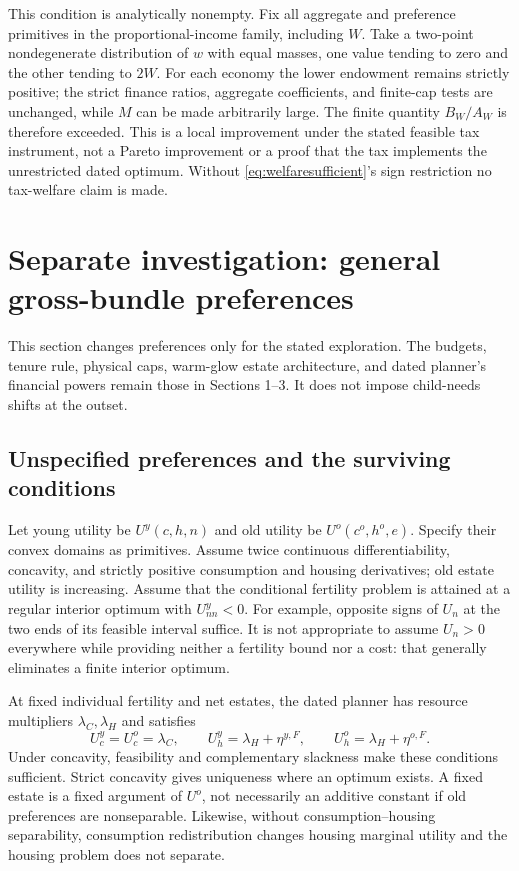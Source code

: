 \documentclass[11pt]{article}
\begin{document}
This condition is analytically nonempty. Fix all aggregate and preference primitives in the proportional-income family, including $W$. Take a two-point nondegenerate distribution of $w$ with equal masses, one value tending to zero and the other tending to $2W$. For each economy the lower endowment remains strictly positive; the strict finance ratios, aggregate coefficients, and finite-cap tests are unchanged, while $M$ can be made arbitrarily large. The finite quantity $B_W/A_W$ is therefore exceeded. This is a local improvement under the stated feasible tax instrument, not a Pareto improvement or a proof that the tax implements the unrestricted dated optimum. Without \eqref{eq:welfaresufficient}'s sign restriction no tax-welfare claim is made.
\clearpage
\section{Separate investigation: general gross-bundle preferences}\label{app:general}
This section changes preferences only for the stated exploration. The budgets, tenure rule, physical caps, warm-glow estate architecture, and dated planner's financial powers remain those in Sections 1--3. It does not impose child-needs shifts at the outset.

\subsection{Unspecified preferences and the surviving conditions}
Let young utility be $U^y(c,h,n)$ and old utility be $U^o(c^o,h^o,e)$. Specify their convex domains as primitives. Assume twice continuous differentiability, concavity, and strictly positive consumption and housing derivatives; old estate utility is increasing. Assume that the conditional fertility problem is attained at a regular interior optimum with $U^y_{nn}<0$. For example, opposite signs of $U_n$ at the two ends of its feasible interval suffice. It is not appropriate to assume $U_n>0$ everywhere while providing neither a fertility bound nor a cost: that generally eliminates a finite interior optimum.

At fixed individual fertility and net estates, the dated planner has resource multipliers $\lambda_C,\lambda_H$ and satisfies
\begin{equation}
 U_c^y=U_c^o=\lambda_C,\qquad
 U_h^y=\lambda_H+\eta^{y,F},\qquad
 U_h^o=\lambda_H+\eta^{o,F}.\label{eq:generalplanner}
\end{equation}
Under concavity, feasibility and complementary slackness make these conditions sufficient. Strict concavity gives uniqueness where an optimum exists. A fixed estate is a fixed argument of $U^o$, not necessarily an additive constant if old preferences are nonseparable. Likewise, without consumption--housing separability, consumption redistribution changes housing marginal utility and the housing problem does not separate.
\end{document}
